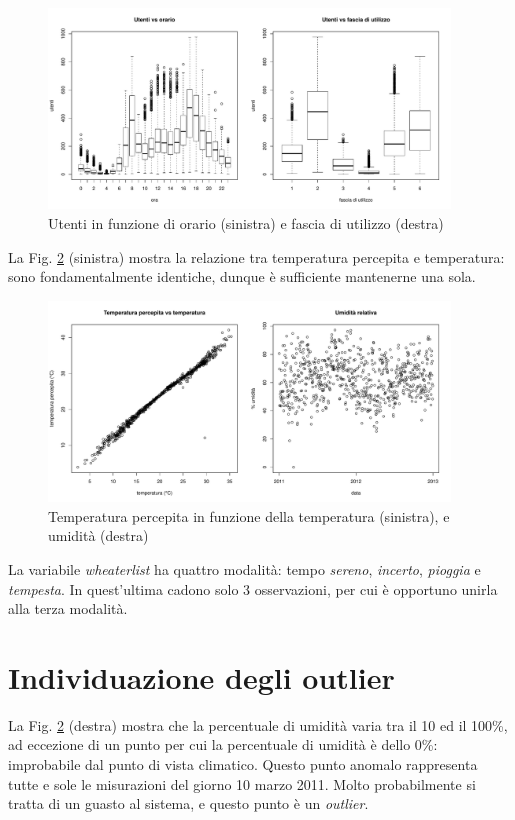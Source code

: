 \documentclass[a4paper, 10pt]{report}
\begin{document}
\begin{figure}
  \centering
  \includegraphics[width=0.95\textwidth]{../plots/hour-timeslot.pdf}
  \caption{Utenti in funzione di orario (sinistra) e fascia di utilizzo (destra)}
  \label{fig:hour-timeslot}
\end{figure}

La Fig. \ref{fig:temperature-humidity} (sinistra) mostra la relazione tra
temperatura percepita e temperatura: sono fondamentalmente identiche,
dunque è sufficiente mantenerne una sola.

\begin{figure}
  \centering
  \includegraphics[width=0.95\textwidth]{../plots/temperature-humidity.pdf}
  \caption{Temperatura percepita in funzione della temperatura (sinistra), e umidità (destra)}
  \label{fig:temperature-humidity}
\end{figure}

La variabile \emph{wheaterlist} ha quattro modalità: tempo \emph{sereno},
\emph{incerto}, \emph{pioggia} e \emph{tempesta}. In quest'ultima cadono
solo 3 osservazioni, per cui è opportuno unirla alla terza modalità.



\section{Individuazione degli outlier}
La Fig. \ref{fig:temperature-humidity} (destra) mostra che la percentuale
di umidità varia tra il 10 ed il 100\%, ad eccezione di un punto per cui
la percentuale di umidità è dello 0\%: improbabile dal punto di vista
climatico. Questo punto anomalo rappresenta tutte e sole le misurazioni
del giorno 10 marzo 2011. Molto probabilmente si tratta di un guasto al
sistema, e questo punto è un \emph{outlier}.
\end{document}
